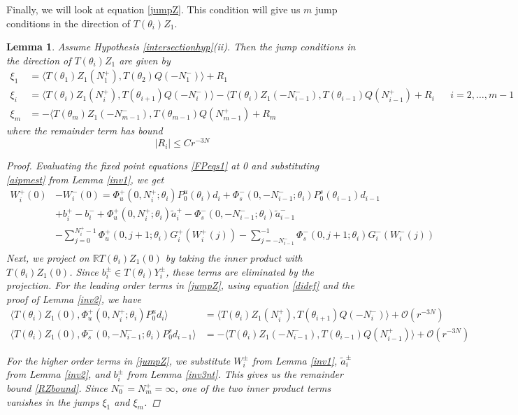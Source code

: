 \documentclass[12pt]{article}
\def\R{{\mathbb R}}
\newtheorem{lemma}{Lemma}
\begin{document}
Finally, we will look at equation \ref{jumpZ}. This condition will give us $m$ jump conditions in the direction of $T(\theta_i) Z_1$.

\begin{lemma}\label{jumpZlemma}
Assume Hypothesis \ref{intersectionhyp}(ii). Then the jump conditions in the direction of $T(\theta_i) Z_1$ are given by
\begin{equation*}
\begin{aligned}
\xi_1 &= \langle T(\theta_1) Z_1(N_1^+), T(\theta_2) Q(-N_1^-) \rangle + R_1  \\
\xi_i &= \langle T(\theta_i) Z_1(N_i^+), T(\theta_{i+1}) Q(-N_i^-) \rangle
- \langle T(\theta_i) Z_1(-N_{i-1}^-), T(\theta_{i-1}) Q(N_{i-1}^+) + R_i &&
i = 2, \dots, m-1 \\
\xi_m &= -\langle T(\theta_m) Z_1(-N_{m-1}^-), T(\theta_{m-1}) Q(N_{m-1}^+) + R_m
\end{aligned}
\end{equation*}
where the remainder term has bound
\begin{equation}\label{RZbound}
|R_i| \leq C r^{-3N}
\end{equation}
\begin{proof}
Evaluating the fixed point equations \eqref{FPeqs1} at 0 and substituting \eqref{aipmest} from Lemma \ref{inv1}, we get
\begin{align*}
W_i^+(0) &- W_i^-(0) = \Phi_u^+(0, N_i^+; \theta_i) P_0^u(\theta_i) d_i + \Phi_s^-(0, -N_{i-1}^-; \theta_i) P_0^s(\theta_{i-1}) d_{i-1} \\
&+ b_i^+ - b_i^- 
+ \Phi_u^+(0, N_i^+; \theta_i) \tilde{a}_i^+ - \Phi_s^-(0, -N_{i-1}^-; \theta_i) \tilde{a}_{i-1}^- \\
&- \sum_{j = 0}^{N_i^+-1} \Phi_u^+(0, j+1; \theta_i) G_i^+(W_i^+(j)) 
- \sum_{j = -N_{i-1}^-}^{-1} \Phi_s^-(0, j+1; \theta_i) G_i^-(W_i^-(j)) \\
\end{align*}
Next, we project on $\R T(\theta_i) Z_1(0)$ by taking the inner product with $T(\theta_i) Z_1(0)$. Since $b_i^\pm \in T(\theta_i) Y_i^\pm$, these terms are eliminated by the projection. For the leading order terms in \eqref{jumpZ}, using equation \eqref{didef} and the proof of Lemma \ref{inv2}, we have
\begin{align*}
\langle T(\theta_i) Z_1(0), \Phi_u^+(0, N_i^+; \theta_i) P_0^u d_i \rangle
&= \langle T(\theta_i) Z_1(N_i^+), T(\theta_{i+1}) Q(-N_i^-) \rangle + \mathcal{O}(r^{-3N}) \\
\langle T(\theta_i) Z_1(0), \Phi_s^-(0, -N_{i-1}^-; \theta_i) P_0^s d_{i-1} \rangle
&= -\langle T(\theta_i) Z_1(-N_{i-1}^-), T(\theta_{i-1}) Q(N_{i-1}^+) \rangle + \mathcal{O}(r^{-3N})
\end{align*}

For the higher order terms in \eqref{jumpZ}, we substitute $W_i^\pm$ from Lemma \ref{inv1}, $\tilde{a}_i^\pm$ from Lemma \ref{inv2}, and $b_i^\pm$ from Lemma \ref{inv3nt}. This gives us the remainder bound \eqref{RZbound}. Since $N_0^- = N_m^+ = \infty$, one of the two inner product terms vanishes in the jumps $\xi_1$ and $\xi_m$. 
\end{proof}
\end{lemma}
\end{document}
